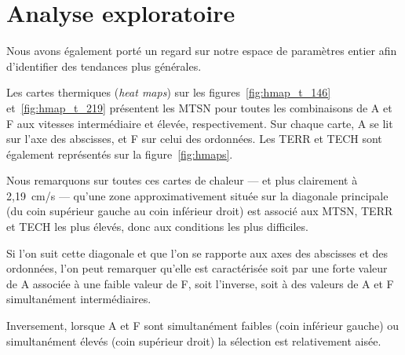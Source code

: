 \section{Analyse exploratoire}
	Nous avons également porté un regard sur notre espace de paramètres entier afin d'identifier des tendances plus générales.

	Les cartes thermiques (\emph{heat maps}) sur les figures~\ref{fig:hmap_t_146} et~\ref{fig:hmap_t_219} présentent les MTSN pour toutes les combinaisons de A et F aux vitesses intermédiaire et élevée, respectivement. Sur chaque carte, A se lit sur l'axe des abscisses, et F sur celui des ordonnées. Les TERR et TECH sont également représentés sur la figure~\ref{fig:hmaps}.
	
	Nous remarquons sur toutes ces cartes de chaleur --- et plus clairement à 2,19~cm/s --- qu'une zone approximativement située sur la diagonale principale (du coin supérieur gauche au coin inférieur droit) est associé aux MTSN, TERR et TECH les plus élevés, donc aux conditions les plus difficiles.
	
	Si l'on suit cette diagonale et que l'on se rapporte aux axes des abscisses et des ordonnées, l'on peut remarquer qu'elle est caractérisée soit par une forte valeur de A associée à une faible valeur de F, soit l'inverse, soit à des valeurs de A et F simultanément intermédiaires.
	
	Inversement, lorsque A et F sont simultanément faibles (coin inférieur gauche) ou simultanément élevés (coin supérieur droit) la sélection est relativement aisée.

